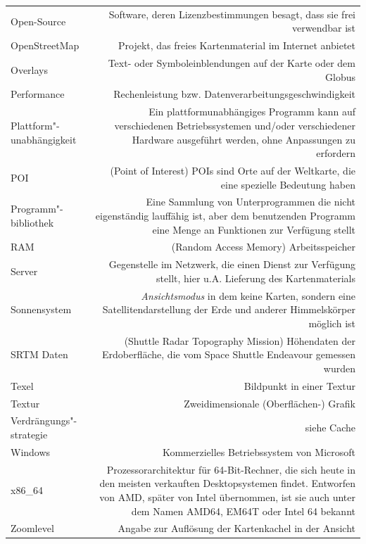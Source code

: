 \documentclass[10pt]{scrreprt}
\newcommand{\textref}[1]{\mbox{\raisebox{0.1ex}{\small$\rightarrow$ }\textit{#1}}}
\begin{document}
\begin{longtabu}{L{0.35} R{1.65}}
Open-Source & Software, deren Lizenzbestimmungen besagt, dass sie frei verwendbar ist\\
OpenStreetMap  & Projekt, das freies Kartenmaterial im Internet anbietet\\
Overlays  & Text- oder Symboleinblendungen auf der Karte oder dem Globus\\
Performance & Rechenleistung bzw. Datenverarbeitungsgeschwindigkeit\\
Plattform"-unabhängigkeit & Ein plattformunabhängiges Programm kann auf verschiedenen Betriebssystemen und/oder verschiedener Hardware ausgeführt werden, ohne Anpassungen zu erfordern\\
POI  & (Point of Interest) POIs sind Orte auf der Weltkarte, die eine spezielle Bedeutung haben\\
Programm"-bibliothek & Eine Sammlung von Unterprogrammen die nicht eigenständig lauffähig ist, aber dem benutzenden Programm eine Menge an Funktionen zur Verfügung stellt\\
RAM & (Random Access Memory) Arbeitsspeicher\\
Server & Gegenstelle im Netzwerk, die einen Dienst zur Verfügung stellt, hier u.A. Lieferung des Kartenmaterials\\
Sonnensystem & \textref{Ansichtsmodus} in dem keine Karten, sondern eine Satellitendarstellung der Erde und anderer Himmelskörper möglich ist \\
SRTM Daten & (Shuttle Radar Topography Mission) Höhendaten der Erdoberfläche, die vom Space Shuttle Endeavour gemessen wurden\\
Texel & Bildpunkt in einer Textur \\
Textur & Zweidimensionale (Oberflächen-) Grafik\\
Verdrängungs"-strategie & siehe Cache\\
Windows & Kommerzielles Betriebssystem von Microsoft\\
x86\_64 & Prozessorarchitektur für 64-Bit-Rechner, die sich heute in den meisten verkauften Desktopsystemen findet. Entworfen von AMD, später von Intel übernommen, ist sie auch unter dem Namen AMD64, EM64T oder Intel 64 bekannt\\
Zoomlevel  & Angabe zur Auflösung der Kartenkachel in der Ansicht\\
\end{longtabu}


\cleardoublepage
\renewcommand{\indexname}{Stichwortverzeichnis}
\printindex
\end{document}
